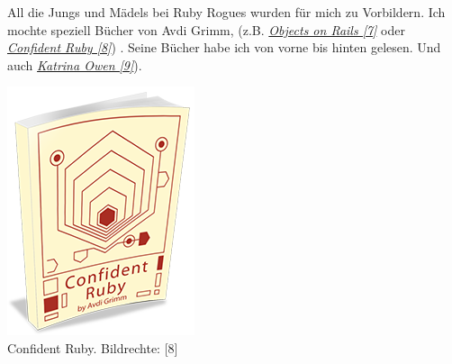 \documentclass[10pt,a4paper,ngerman,twoside]{article} %
\begin{document}
\begin{multicols}{3}
All die Jungs und Mädels bei Ruby Rogues wurden für mich zu Vorbildern. Ich mochte speziell Bücher von  Avdi Grimm, (z.B. \href{http://objectsonrails.com/}{\textit{Objects on Rails [7]}} oder \href{http://www.confidentruby.com/}{\textit{Confident Ruby [8]}}) 
. Seine Bücher habe ich von vorne bis hinten gelesen. Und auch \href{http://kytrinyx.com/}{\textit{Katrina Owen [9]}}). \\
\begin{center}
\includegraphics[width=\linewidth]{floor/floor-ruby.png} \\
\footnotesize{Confident Ruby. Bildrechte: [8]} \\

\end{center}
\end{multicols}
\end{document}
